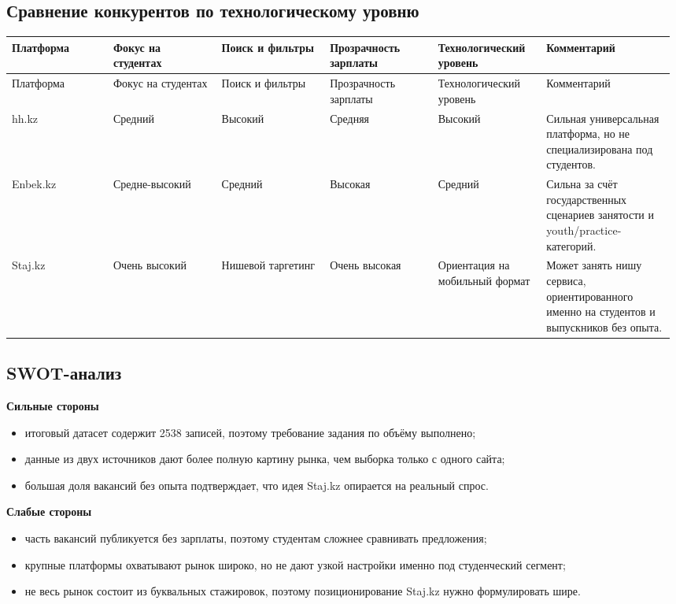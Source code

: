 \documentclass[12pt,a4paper]{article}
\begin{document}
\subsection{Сравнение конкурентов по технологическому уровню}
\begin{longtable}{p{0.15\linewidth}p{0.16\linewidth}p{0.16\linewidth}p{0.16\linewidth}p{0.16\linewidth}p{0.19\linewidth}}
\toprule
Платформа & Фокус на студентах & Поиск и фильтры & Прозрачность зарплаты & Технологический уровень & Комментарий\\
\midrule
\endfirsthead
\toprule
Платформа & Фокус на студентах & Поиск и фильтры & Прозрачность зарплаты & Технологический уровень & Комментарий\\
\midrule
\endhead
hh.kz & Средний & Высокий & Средняя & Высокий & Сильная универсальная платформа, но не специализирована под студентов.\\
Enbek.kz & Средне-высокий & Средний & Высокая & Средний & Сильна за счёт государственных сценариев занятости и youth/practice-категорий.\\
Staj.kz & Очень высокий & Нишевой таргетинг & Очень высокая & Ориентация на мобильный формат & Может занять нишу сервиса, ориентированного именно на студентов и выпускников без опыта.\\
\bottomrule
\end{longtable}

\subsection{SWOT-анализ}
\textbf{Сильные стороны}
\begin{itemize}
\item итоговый датасет содержит 2538 записей, поэтому требование задания по объёму выполнено;
\item данные из двух источников дают более полную картину рынка, чем выборка только с одного сайта;
\item большая доля вакансий без опыта подтверждает, что идея Staj.kz опирается на реальный спрос.
\end{itemize}

\textbf{Слабые стороны}
\begin{itemize}
\item часть вакансий публикуется без зарплаты, поэтому студентам сложнее сравнивать предложения;
\item крупные платформы охватывают рынок широко, но не дают узкой настройки именно под студенческий сегмент;
\item не весь рынок состоит из буквальных стажировок, поэтому позиционирование Staj.kz нужно формулировать шире.
\end{itemize}
\end{document}
